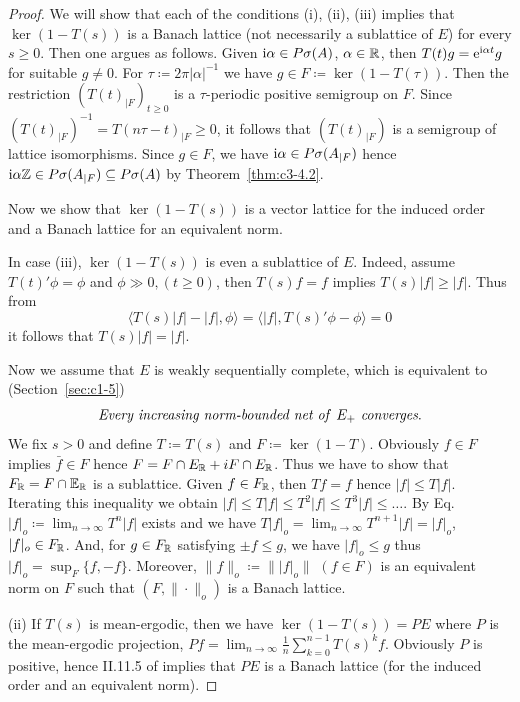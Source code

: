 \begin{proof}
	We will show that each of the conditions (i), (ii), (iii) implies that $\ker(1 - T(s))$ is a Banach lattice (not necessarily a sublattice of\/ $E$) for every $s \geq 0$. 
	Then one argues as follows. Given $\mathrm{i}\alpha \in P\sigma(A)$, $\alpha \in \mathbb{R} $, then $T(t)g = \mathrm{e}^{\mathrm{i}\alpha t}g$ for suitable $g \neq 0$. 
	For $\tau \coloneq  2\pi|\alpha|^{-1}$ we have $g \in F \coloneq  \ker (1 - T(\tau))$. 
	Then the restriction $(T(t)_{|F})_{t \geq 0}$ is a $\tau$-periodic positive semigroup on $F$. 
	Since $\left(T(t)_{|F}\right)^{-1} = T(n\tau-t)_{|F} \geq 0$, it follows that $(T(t)_{|F})$ is a semigroup of lattice isomorphisms. 
	Since $g \in F$, we have $\mathrm{i}\alpha \in P\sigma(A_{|F})$ hence $\mathrm{i}\alpha\mathbb{Z} \in P\sigma(A_{|F}) \subseteq P\sigma(A)$ by Theorem~\ref{thm:c3-4.2}.
	
	Now we show that $\ker (1 - T(s))$ is a vector lattice for the induced order and a Banach lattice for an equivalent norm.
	
	In case (iii), $\ker (1 - T(s))$ is even a sublattice of\/ $E$. 
	Indeed, assume $T(t)'\phi = \phi$ and $\phi \gg 0 ,  (t \geq 0)$, then $T(s)f = f$ implies $T(s)|f| \geq |f|$. 
	Thus from 
\[
	\langle T(s)|f| - |f|,\phi\rangle = \langle |f|,T(s)'\phi - \phi \rangle = 0
\]
%
it follows that $T(s)|f| = |f|$.
	
	Now we assume that $E$ is weakly sequentially complete, which is equivalent to (\cf Section~\ref{sec:c1-5})
\begin{equation}\label{eq:c3-4.5}
	\textit{Every increasing norm-bounded net of\/ $E_{+}$ converges}.
\end{equation}
	We fix $s > 0$ and define $T \coloneq  T(s)$ and $F \coloneq  \ker (1 - T)$. 
	Obviously $f \in F$ implies $\bar{f} \in F$ hence $F = F\cap E_{\mathbb{R} } + iF\cap E_{\mathbb{R} }$. 
	Thus we have to show that $F_{\mathbb{R} } = F\cap\mathbb{E}_{\mathbb{R} }$ is a sublattice. 
	Given $f \in F_{\mathbb{R} }$, then $Tf = f$ hence $|f| \leq T|f|$. 
	Iterating this inequality we obtain $|f| \leq T|f| \leq T^{2}|f| \leq T^{3}|f| \leq \ldots$.
	By Eq.~ $|f|_{o} \coloneq  \lim_{n\to \infty} T^{n}|f|$ exists and we have $T|f|_{o} = \lim_{n\to \infty} T^{n+1}|f| = |f|_{o}$, \ie $|f|_{o} \in F_{\mathbb{R} }$.
	And, for $g \in F_{\mathbb{R} }$ satisfying $\pm f \leq g$, we have $|f|_{o} \leq g$ thus $|f|_{o} = \sup_{F}\{f,-f\}$. 
	Moreover, $\|f\|_{o} \coloneq  \||f|_{o}\|$ $(f \in F)$ is an equivalent norm on $F$ such that $(F,\|\cdot\|_{o})$ is a Banach lattice.
	
	(ii) If\/ $T(s)$ is mean-ergodic, then we have $\ker (1 - T(s)) = PE$ where $P$ is the mean-ergodic projection, \ie $Pf = \lim_{n\to \infty}\frac{1}{n}\sum_{k=0}^{n-1}T(s)^{k}f$.
	Obviously $P$ is positive, hence II.11.5 of \textcite{schaefer:1974} implies that $PE$ is a Banach lattice (for the induced order and an equivalent norm).
\end{proof}
